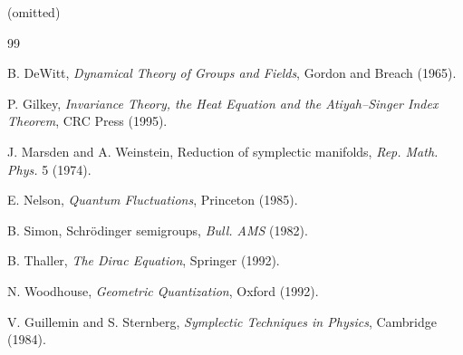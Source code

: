 \documentclass[11pt]{article}
\begin{document}
(omitted)

\begin{thebibliography}{99}

B. DeWitt, \emph{Dynamical Theory of Groups and Fields}, Gordon and Breach (1965).

P. Gilkey, \emph{Invariance Theory, the Heat Equation and the Atiyah–Singer Index Theorem}, CRC Press (1995).

J. Marsden and A. Weinstein, Reduction of symplectic manifolds, \emph{Rep. Math. Phys.} 5 (1974).

E. Nelson, \emph{Quantum Fluctuations}, Princeton (1985).

B. Simon, Schrödinger semigroups, \emph{Bull. AMS} (1982).

B. Thaller, \emph{The Dirac Equation}, Springer (1992).

N. Woodhouse, \emph{Geometric Quantization}, Oxford (1992).

V. Guillemin and S. Sternberg, \emph{Symplectic Techniques in Physics}, Cambridge (1984).

\end{thebibliography}
\end{document}
